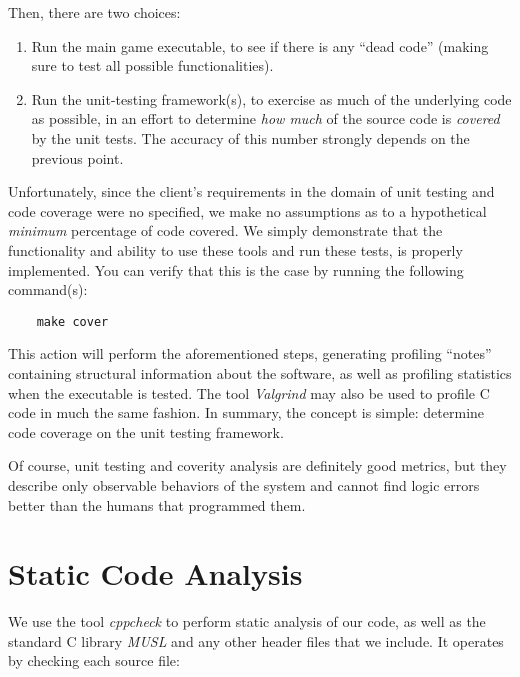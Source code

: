 \documentclass[letterpaper]{article}
\begin{document}
Then, there are two choices:

\begin{enumerate}
    \item Run the main game executable, to see if there is any
          ``dead code'' (making sure to test all possible
          functionalities).
    \item Run the unit-testing framework(s), to exercise as much
          of the underlying code as possible, in an effort to
          determine \emph{how much} of the source code is
          \emph{covered} by the unit tests. The accuracy of this
          number strongly depends on the previous point.
\end{enumerate}

Unfortunately, since the client's requirements in the domain of
unit testing and code coverage were no specified, we make no
assumptions as to a hypothetical \emph{minimum} percentage of
code covered. We simply demonstrate that the functionality and
ability to use these tools and run these tests, is properly
implemented. You can verify that this is the case by running the
following command(s):

\lstset{frame=none}
\begin{lstlisting}
    make cover
\end{lstlisting}

This action will perform the aforementioned steps, generating
profiling ``notes'' containing structural information about the
software, as well as profiling statistics when the executable is
tested. The tool \emph{Valgrind} may also be used to profile
C code in much the same fashion. In summary, the concept is
simple: determine code coverage on the unit testing framework.

Of course, unit testing and coverity analysis are definitely
good metrics, but they describe only observable behaviors of the
system and cannot find logic errors better than the humans that
programmed them.


\section{Static Code Analysis}

We use the tool \emph{cppcheck} to perform static analysis of
our code, as well as the standard C library \emph{MUSL} and any
other header files that we include. It operates by checking each
source file:
\end{document}
